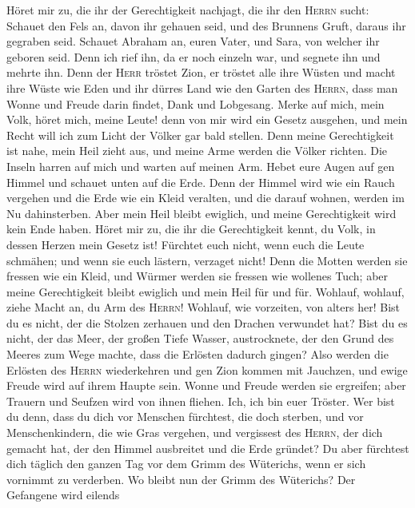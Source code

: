  Höret mir zu, die ihr der Gerechtigkeit nachjagt, die ihr
den \textsc{Herrn} sucht: Schauet den Fels an, davon ihr gehauen seid,
und des Brunnens Gruft, daraus ihr gegraben seid.  Schauet
Abraham an, euren Vater, und Sara, von welcher ihr geboren seid. Denn
ich rief ihn, da er noch einzeln war, und segnete ihn und mehrte ihn.
 Denn der \textsc{Herr} tröstet Zion, er tröstet alle ihre
Wüsten und macht ihre Wüste wie Eden und ihr dürres Land wie den Garten
des \textsc{Herrn}, dass man Wonne und Freude darin findet, Dank und
Lobgesang.  Merke auf mich, mein Volk, höret mich, meine
Leute! denn von mir wird ein Gesetz ausgehen, und mein Recht will ich
zum Licht der Völker gar bald stellen.  Denn meine
Gerechtigkeit ist nahe, mein Heil zieht aus, und meine Arme werden die
Völker richten. Die Inseln harren auf mich und warten auf meinen Arm.
 Hebet eure Augen auf gen Himmel und schauet unten auf die
Erde. Denn der Himmel wird wie ein Rauch vergehen und die Erde wie ein
Kleid veralten, und die darauf wohnen, werden im Nu dahinsterben. Aber
mein Heil bleibt ewiglich, und meine Gerechtigkeit wird kein Ende haben.
 Höret mir zu, die ihr die Gerechtigkeit kennt, du Volk,
in dessen Herzen mein Gesetz ist! Fürchtet euch nicht, wenn euch die
Leute schmähen; und wenn sie euch lästern, verzaget nicht!
 Denn die Motten werden sie fressen wie ein Kleid, und
Würmer werden sie fressen wie wollenes Tuch; aber meine Gerechtigkeit
bleibt ewiglich und mein Heil für und für.  Wohlauf,
wohlauf, ziehe Macht an, du Arm des \textsc{Herrn}! Wohlauf, wie
vorzeiten, von alters her! Bist du es nicht, der die Stolzen zerhauen
und den Drachen verwundet hat?  Bist du es nicht, der das
Meer, der großen Tiefe Wasser, austrocknete, der den Grund des Meeres
zum Wege machte, dass die Erlösten dadurch gingen?  Also
werden die Erlösten des \textsc{Herrn} wiederkehren und gen Zion kommen
mit Jauchzen, und ewige Freude wird auf ihrem Haupte sein. Wonne und
Freude werden sie ergreifen; aber Trauern und Seufzen wird von ihnen
fliehen.  Ich, ich bin euer Tröster. Wer bist du denn,
dass du dich vor Menschen fürchtest, die doch sterben, und vor
Menschenkindern, die wie Gras vergehen,  und vergissest
des \textsc{Herrn}, der dich gemacht hat, der den Himmel ausbreitet und
die Erde gründet? Du aber fürchtest dich täglich den ganzen Tag vor dem
Grimm des Wüterichs, wenn er sich vornimmt zu verderben. Wo bleibt nun
der Grimm des Wüterichs?  Der Gefangene wird eilends
